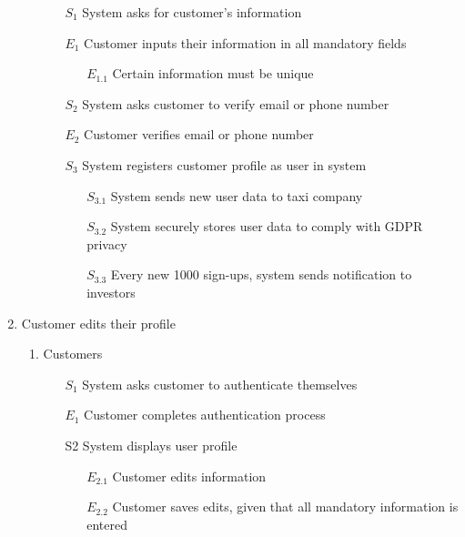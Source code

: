 \documentclass[]{article}
\begin{document}
\begin{enumerate}[{\textbf{BE}}1.]
\begin{enumerate}[{\textbf{VP}1}.1]
            \begin{enumerate}
                \item[$S_1$] System asks for customer’s information
                \item[$E_1$] Customer inputs their information in all mandatory fields
                \begin{enumerate}
                \item[$E_{1.1}$] Certain information must be unique
                \end{enumerate}
\color{blue}
                \item[$S_2$] System asks customer to verify email or phone number
                \item[$E_2$] Customer verifies email or phone number
\color{black}
                \item[$S_3$] System registers customer profile as user in system
                \begin{enumerate}
                \item[$S_{3.1}$] System sends new user data to taxi company
                \item[$S_{3.2}$] System securely stores user data to comply with GDPR privacy
\color{blue}
                \item[$S_{3.3}$] Every new 1000 sign-ups, system sends notification to investors
\color{black}
                \end{enumerate}
            \end{enumerate}
    \end{enumerate}
    \item Customer edits their profile
    \begin{enumerate}[{\textbf{VP2}}.1]
        \item Customers
            \begin{enumerate}
                \item[$S_1$] System asks customer to authenticate themselves
                    \item[$E_1$] Customer completes authentication process
                \item[S2] System displays user profile
                \begin{enumerate}
                    \item[$E_{2.1}$] Customer edits information
                    \item[$E_{2.2}$] Customer saves edits, given that all mandatory information is entered
                \end{enumerate}

\end{enumerate}
\end{enumerate}
\end{enumerate}
\end{document}
